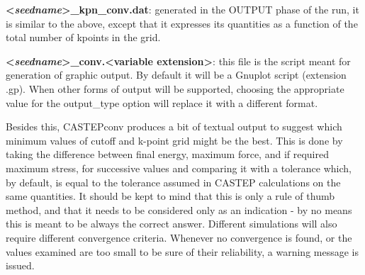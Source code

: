 \documentclass[10pt]{article}
\begin{document}
\textbf{\textless \textit{seedname}\textgreater\_kpn\_conv.dat}: generated in the OUTPUT phase of the run, it is similar to the above, except that it expresses its quantities as a function of the total number of kpoints in the grid.

\textbf{\textless \textit{seedname}\textgreater\_conv.\textless variable extension\textgreater}: this file is the script meant for generation of graphic output. By default it will be a Gnuplot script (extension .gp). When other forms of output will be supported, choosing the appropriate value for the output\_type option will replace it with a different format.

Besides this, CASTEPconv produces a bit of textual output to suggest which minimum values of cutoff and k-point grid might be the best. This is done by taking the difference between final energy, maximum force, and if required maximum stress, for successive values and comparing it with a tolerance which, by default, is equal to the tolerance assumed in CASTEP calculations on the same quantities. It should be kept to mind that this is only a rule of thumb method, and that it needs to be considered only as an indication - by no means this is meant to be always the correct answer. Different simulations will also require different convergence criteria. Whenever no convergence is found, or the values examined are too small to be sure of their reliability, a warning message is issued.
\end{document}
